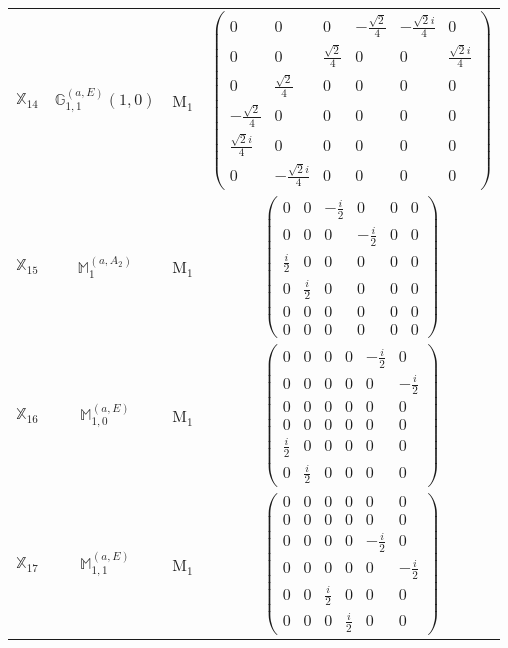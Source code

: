 \documentclass[fleqn,10pt,landscape]{article}
\begin{document}
\begin{itemize}
\begin{center}
\begin{longtable}{c|c|c|c}
$ \mathbb{X}_{14} $ & $\mathbb{G}_{1,1}^{(a,E)}(1,0)$ & M$_{1}$ & $\begin{pmatrix} 0 & 0 & 0 & - \frac{\sqrt{2}}{4} & - \frac{\sqrt{2} i}{4} & 0 \\ 0 & 0 & \frac{\sqrt{2}}{4} & 0 & 0 & \frac{\sqrt{2} i}{4} \\ 0 & \frac{\sqrt{2}}{4} & 0 & 0 & 0 & 0 \\ - \frac{\sqrt{2}}{4} & 0 & 0 & 0 & 0 & 0 \\ \frac{\sqrt{2} i}{4} & 0 & 0 & 0 & 0 & 0 \\ 0 & - \frac{\sqrt{2} i}{4} & 0 & 0 & 0 & 0 \end{pmatrix}$ \\
$ \mathbb{X}_{15} $ & $\mathbb{M}_{1}^{(a,A_{2})}$ & M$_{1}$ & $\begin{pmatrix} 0 & 0 & - \frac{i}{2} & 0 & 0 & 0 \\ 0 & 0 & 0 & - \frac{i}{2} & 0 & 0 \\ \frac{i}{2} & 0 & 0 & 0 & 0 & 0 \\ 0 & \frac{i}{2} & 0 & 0 & 0 & 0 \\ 0 & 0 & 0 & 0 & 0 & 0 \\ 0 & 0 & 0 & 0 & 0 & 0 \end{pmatrix}$ \\
$ \mathbb{X}_{16} $ & $\mathbb{M}_{1,0}^{(a,E)}$ & M$_{1}$ & $\begin{pmatrix} 0 & 0 & 0 & 0 & - \frac{i}{2} & 0 \\ 0 & 0 & 0 & 0 & 0 & - \frac{i}{2} \\ 0 & 0 & 0 & 0 & 0 & 0 \\ 0 & 0 & 0 & 0 & 0 & 0 \\ \frac{i}{2} & 0 & 0 & 0 & 0 & 0 \\ 0 & \frac{i}{2} & 0 & 0 & 0 & 0 \end{pmatrix}$ \\
$ \mathbb{X}_{17} $ & $\mathbb{M}_{1,1}^{(a,E)}$ & M$_{1}$ & $\begin{pmatrix} 0 & 0 & 0 & 0 & 0 & 0 \\ 0 & 0 & 0 & 0 & 0 & 0 \\ 0 & 0 & 0 & 0 & - \frac{i}{2} & 0 \\ 0 & 0 & 0 & 0 & 0 & - \frac{i}{2} \\ 0 & 0 & \frac{i}{2} & 0 & 0 & 0 \\ 0 & 0 & 0 & \frac{i}{2} & 0 & 0 \end{pmatrix}$ \\

\end{longtable}
\end{center}
\end{itemize}
\end{document}
